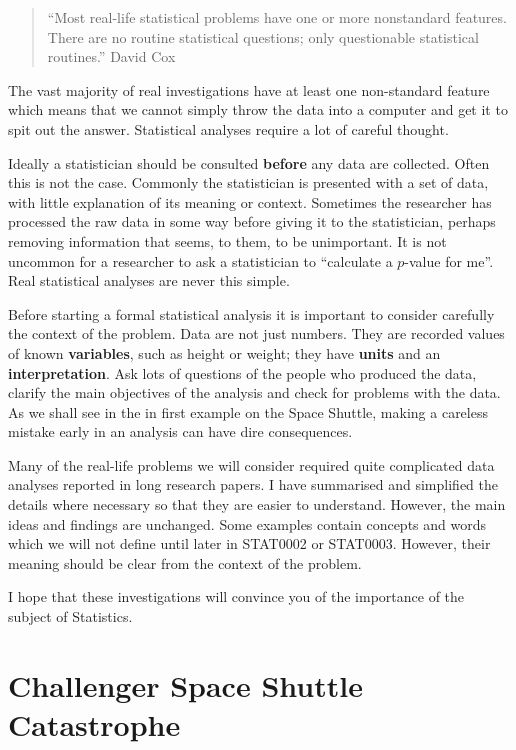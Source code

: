 \documentclass[
  british,
]{book}
\begin{document}
\begin{quote}
``Most real-life statistical problems have one or more nonstandard features. There are no routine statistical questions; only questionable statistical routines.'' David Cox
\end{quote}

The vast majority of real investigations have at least one non-standard feature which means that we cannot simply throw the data into a computer and get it to spit out the answer. Statistical analyses require a lot of careful thought.

Ideally a statistician should be consulted \textbf{before} any data are collected. Often this is not the case. Commonly the statistician is presented with a set of data, with little explanation of its meaning or context. Sometimes the researcher has processed the raw data in some way before giving it to the statistician, perhaps removing information that seems, to them, to be unimportant. It is not uncommon for a researcher to ask a statistician to ``calculate a \(p\)-value for me''. Real statistical analyses are never this simple.

Before starting a formal statistical analysis it is important to consider carefully the context of the problem. Data are not just numbers. They are recorded values of known \textbf{variables}, such as height or weight;
they have \textbf{units} and an \textbf{interpretation}. Ask lots of questions of the people who produced the data, clarify the main objectives of the analysis and check for problems with the data. As we shall see in the in first example on the Space Shuttle, making a careless mistake early in an analysis can have
dire consequences.

Many of the real-life problems we will consider required quite complicated data analyses reported in long research papers. I have summarised and simplified the details where necessary so that they are easier to understand. However, the main ideas and findings are unchanged. Some examples contain concepts and words which we will not define until later in STAT0002 or STAT0003. However, their meaning should be clear from the context of the problem.

I hope that these investigations will convince you of the importance of the subject of Statistics.

\hypertarget{shuttle}{%
\section{Challenger Space Shuttle Catastrophe}\label{shuttle}}
\end{document}
